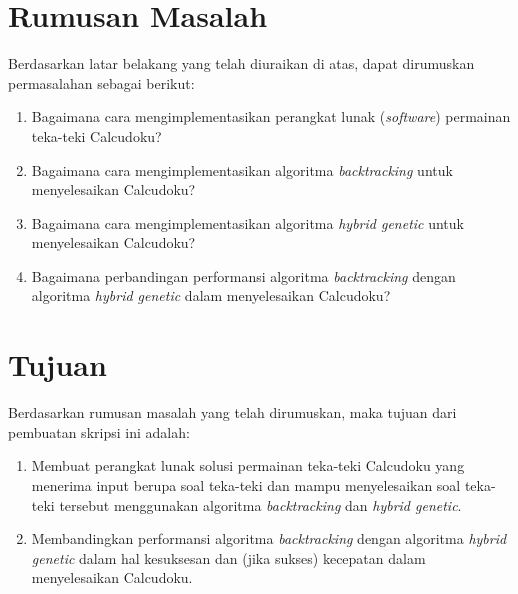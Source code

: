 \section{Rumusan Masalah}
\label{sec:rumusan}
Berdasarkan latar belakang yang telah diuraikan di atas, dapat dirumuskan permasalahan sebagai berikut:
\begin{enumerate}
\item Bagaimana cara mengimplementasikan perangkat lunak (\textit{software}) permainan teka-teki Calcudoku?
\item Bagaimana cara mengimplementasikan algoritma \textit{backtracking} untuk menyelesaikan Calcudoku?
\item Bagaimana cara mengimplementasikan algoritma \textit{hybrid genetic} untuk menyelesaikan Calcudoku?
\item Bagaimana perbandingan performansi algoritma \textit{backtracking} dengan algoritma \textit{hybrid genetic} dalam menyelesaikan Calcudoku?
\end{enumerate}

\section{Tujuan}
\label{sec:tujuan}
Berdasarkan rumusan masalah yang telah dirumuskan, maka tujuan dari pembuatan skripsi ini adalah:
\begin{enumerate}
\item Membuat perangkat lunak solusi permainan teka-teki Calcudoku yang menerima input berupa soal teka-teki dan mampu menyelesaikan soal teka-teki tersebut menggunakan algoritma \textit{backtracking} dan \textit{hybrid genetic}.
\item Membandingkan performansi algoritma \textit{backtracking} dengan algoritma \textit{hybrid genetic} dalam hal kesuksesan dan (jika sukses) kecepatan dalam menyelesaikan Calcudoku.
\end{enumerate}

\clearpage

